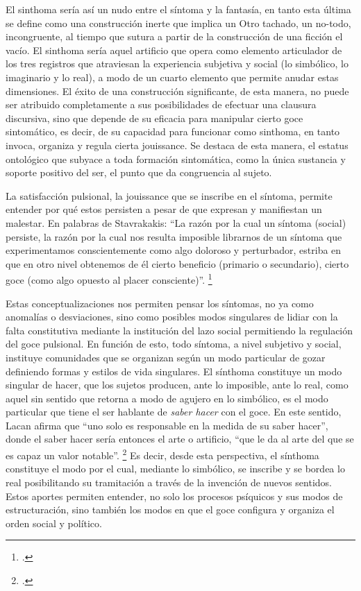El sinthoma sería así un nudo entre el síntoma y la fantasía, en tanto esta última se define como una construcción inerte que implica un Otro tachado, un no-todo, incongruente, al tiempo que sutura a partir de la construcción de una ficción el vacío. El sinthoma sería aquel artificio que opera como elemento articulador de los tres registros que atraviesan la experiencia subjetiva y social (lo simbólico, lo imaginario y lo real), a modo de un cuarto elemento que permite anudar estas dimensiones. El éxito de una construcción significante, de esta manera, no puede ser atribuido completamente a sus posibilidades de efectuar una clausura discursiva, sino que depende de su eficacia para manipular cierto goce sintomático, es decir, de su capacidad para funcionar como sinthoma, en tanto invoca, organiza y regula cierta jouissance. Se destaca de esta manera, el estatus ontológico que subyace a toda formación sintomática, como la única sustancia y soporte positivo del ser, el punto que da congruencia al sujeto.

La satisfacción pulsional, la jouissance que se inscribe en el síntoma, permite entender por qué estos persisten a pesar de que expresan y manifiestan un malestar. En palabras de Stavrakakis: \enquote{La razón por la cual un síntoma (social) persiste, la razón por la cual nos resulta imposible librarnos de un síntoma que experimentamos conscientemente como algo doloroso y perturbador, estriba en que en otro nivel obtenemos de él cierto beneficio (primario o secundario), cierto goce (como algo opuesto al placer consciente)}. \footcite[][100]{@7003-STAVRAKAKIS2010}

Estas conceptualizaciones nos permiten pensar los síntomas, no ya como anomalías o desviaciones, sino como posibles modos singulares de lidiar con la falta constitutiva mediante la institución del lazo social permitiendo la regulación del goce pulsional. En función de esto, todo síntoma, a nivel subjetivo y social, instituye comunidades que se organizan según un modo particular de gozar definiendo formas y estilos de vida singulares. El sínthoma constituye un modo singular de hacer, que los sujetos producen, ante lo imposible, ante lo real, como aquel sin sentido que retorna a modo de agujero en lo simbólico, es el modo particular que tiene el ser hablante de \emph{saber hacer} con el goce. En este sentido, Lacan afirma que \enquote{uno solo es responsable en la medida de su saber hacer}, donde el saber hacer sería entonces el arte o artificio, \enquote{que le da al arte del que se es capaz un valor notable}. \footcite[][59]{@7113-LACAN2006} Es decir, desde esta perspectiva, el sínthoma constituye el modo por el cual, mediante lo simbólico, se inscribe y se bordea lo real posibilitando su tramitación a través de la invención de nuevos sentidos. Estos aportes permiten entender, no solo los procesos psíquicos y sus modos de estructuración, sino también los modos en que el goce configura y organiza el orden social y político.

